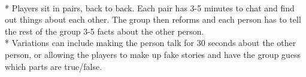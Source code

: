 \begin{minipage}{\textwidth}
\\*
Players sit in pairs, back to back.  Each pair has 3-5 minutes to chat and find out things about each other.  The group then reforms and each person has to tell the rest of the group 3-5 facts about the other person.\\*
Variations can include making the person talk for 30 seconds about the other person, or allowing the players to make up fake stories and have the group guess which parts are true/false.
\end{minipage}    \vfill
